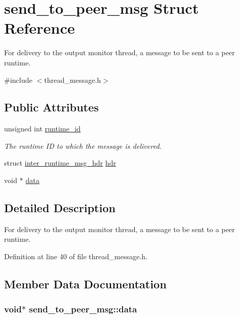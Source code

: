 \hypertarget{structsend__to__peer__msg}{\section{send\-\_\-to\-\_\-peer\-\_\-msg Struct Reference}
\label{structsend__to__peer__msg}
}


For delivery to the output monitor thread, a message to be sent to a peer runtime.  




{\ttfamily \#include $<$thread\-\_\-message.\-h$>$}

\subsection*{Public Attributes}
\begin{DoxyCompactItemize}
\item 
unsigned int \hyperlink{structsend__to__peer__msg_a291ea22d7a3784c77f7df0c78e06b84a}{runtime\-\_\-id}
\begin{DoxyCompactList}\small\item\em The runtime I\-D to which the message is delivered. \end{DoxyCompactList}\item 
struct \hyperlink{structinter__runtime__msg__hdr}{inter\-\_\-runtime\-\_\-msg\-\_\-hdr} \hyperlink{structsend__to__peer__msg_a5e233e774179fa4a3dbe2706c0c9955f}{hdr}
\item 
void $\ast$ \hyperlink{structsend__to__peer__msg_a2a6728008d8e4e13bcb78755b020974c}{data}
\end{DoxyCompactItemize}


\subsection{Detailed Description}
For delivery to the output monitor thread, a message to be sent to a peer runtime. 

Definition at line 40 of file thread\-\_\-message.\-h.



\subsection{Member Data Documentation}
\hypertarget{structsend__to__peer__msg_a2a6728008d8e4e13bcb78755b020974c}{
\subsubsection[{data}]{\setlength{\rightskip}{0pt plus 5cm}void$\ast$ send\-\_\-to\-\_\-peer\-\_\-msg\-::data}}\label{structsend__to__peer__msg_a2a6728008d8e4e13bcb78755b020974c}



